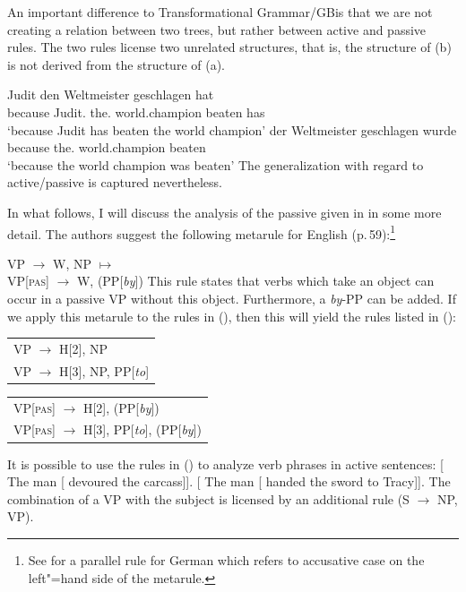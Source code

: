 An important difference to Transformational Grammar/GB\indexgb\indexmp is that we are not creating a
relation between two trees, but rather between active and passive rules. The two rules license two
unrelated structures, that is, the structure of (b) is not derived from the structure of (a). 

\eal
\ex 
\gll [weil] Judit den Weltmeister geschlagen hat\\
     \spacebr{}because Judit.\nom{} the.\acc{} world.champion beaten has\\
\glt `because Judit has beaten the world champion'
\ex 
\gll [weil] der Weltmeister geschlagen wurde\\
     \spacebr{}because the.\nom{} world.champion beaten \AUX\\
\glt `because the world champion was beaten'
\zl
%
The generalization with regard to active/passive is captured nevertheless.

In what follows, I will discuss the analysis of the passive given in  in some more detail. The authors suggest the following metarule
for English (p.\,59):\footnote{%
  See  for a parallel rule for German which refers to accusative case on the left"=hand side of the metarule.
}

\ea
VP  $\to$ W, NP $\mapsto$\\
VP[\textsc{pas}]  $\to$ W, (PP[\emph{by}])
\z
This rule states that verbs which take an object can occur in a passive VP without this object. Furthermore, a \emph{by}-PP can be added.
If we apply this metarule to the rules in (), then this will yield the rules listed in ():
\ea
\begin{tabular}[t]{@{}l@{}}
VP $\to$ H[2], NP\\
VP $\to$ H[3], NP, PP[\emph{to}]\\
\end{tabular}
\z
\ea
\begin{tabular}[t]{@{}l@{}}
VP[\textsc{pas}] $\to$ H[2], (PP[\emph{by}])\\
VP[\textsc{pas}] $\to$ H[3], PP[\emph{to}], (PP[\emph{by}])\\
\end{tabular}
\z
It is possible to use the rules in () to analyze verb phrases in active sentences:
\eal
\ex{} [ The man [ devoured the carcass]].
\ex{} [ The man [ handed the sword to Tracy]].
\zl
The combination of a VP with the subject is licensed by an additional rule (S $\to$ NP,
VP).

